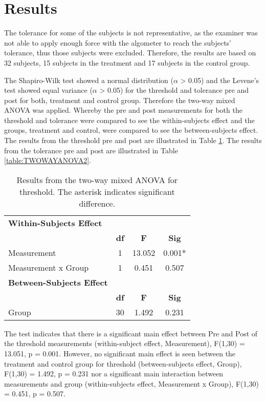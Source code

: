 \section{Results}
The tolerance for some of the subjects is not representative, as the examiner was not able to apply enough force with the algometer to reach the subjects' tolerance, thus those subjects were excluded. Therefore,
the results are based on 32 subjects, 15 subjects in the treatment and 17 subjects in the control group. 

The Shapiro-Wilk test showed a normal distribution ($\alpha$ > 0.05) and the Levene's test showed equal variance ($\alpha$ > 0.05) for the threshold and tolerance pre and post for both, treatment and control group. Therefore the two-way mixed ANOVA was applied. Whereby the pre and post measurements for both the threshold and tolerance were compared to see the within-subjects effect and the groups, treatment and control, were compared to see the between-subjects effect. The results from the threshold pre and post are illustrated in Table \ref{table:TWOWAYANOVA1}.   The results from the tolerance pre and post are illustrated in Table \ref{table:TWOWAYANOVA2}. 

\begin{table}[ht]
\caption{Results from the two-way mixed ANOVA for threshold. The asterisk indicates significant difference.}
\centering
\begin{tabular}{l c c c}
\hline \hline
\textbf{Within-Subjects Effect} \\
& \textbf{df} &\textbf{F} & \textbf{Sig} \\ [0.5ex] %
Measurement & 1 & 13.052 &  0.001* \\
Measurement x Group & 1 & 0.451 & 0.507 \\
\hline \hline
\textbf{Between-Subjects Effect}  \\
& \textbf{df} & \textbf{F} & \textbf{Sig} \\ [0.5ex] %
Group & 30 & 1.492 &  0.231 \\
\hline
\end{tabular}
\label{table:TWOWAYANOVA1}
\end{table}

\noindent
The test indicates that there is a significant main effect between Pre and Post of the threshold measurements (within-subject effect, Measurement), F(1,30) = 13.051, p = 0.001. However, no significant main effect is seen between the treatment and control group for threshold (between-subjects effect, Group), F(1,30) = 1.492, p = 0.231 nor a significant main interaction between measurements and group (within-subjects effect, Measurement x Group), F(1,30) = 0.451, p = 0.507. 

